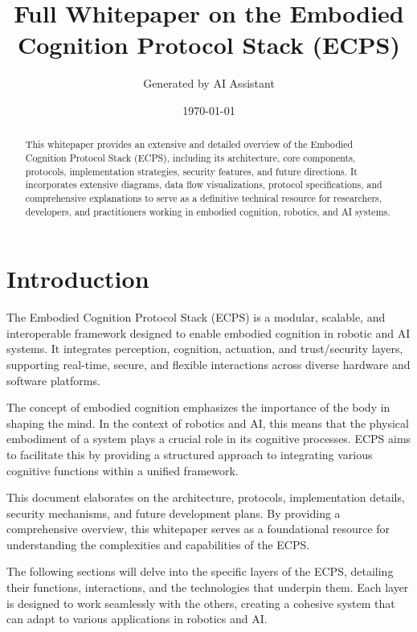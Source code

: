 \documentclass[12pt]{article}
\begin{document}
\title{Full Whitepaper on the Embodied Cognition Protocol Stack (ECPS)}
\author{Generated by AI Assistant}
\date{\today}
\maketitle

\begin{abstract}
This whitepaper provides an extensive and detailed overview of the Embodied Cognition Protocol Stack (ECPS), including its architecture, core components, protocols, implementation strategies, security features, and future directions. It incorporates extensive diagrams, data flow visualizations, protocol specifications, and comprehensive explanations to serve as a definitive technical resource for researchers, developers, and practitioners working in embodied cognition, robotics, and AI systems.
\end{abstract}

\tableofcontents

\section{Introduction}
The Embodied Cognition Protocol Stack (ECPS) is a modular, scalable, and interoperable framework designed to enable embodied cognition in robotic and AI systems. It integrates perception, cognition, actuation, and trust/security layers, supporting real-time, secure, and flexible interactions across diverse hardware and software platforms. 

The concept of embodied cognition emphasizes the importance of the body in shaping the mind. In the context of robotics and AI, this means that the physical embodiment of a system plays a crucial role in its cognitive processes. ECPS aims to facilitate this by providing a structured approach to integrating various cognitive functions within a unified framework.

This document elaborates on the architecture, protocols, implementation details, security mechanisms, and future development plans. By providing a comprehensive overview, this whitepaper serves as a foundational resource for understanding the complexities and capabilities of the ECPS.

The following sections will delve into the specific layers of the ECPS, detailing their functions, interactions, and the technologies that underpin them. Each layer is designed to work seamlessly with the others, creating a cohesive system that can adapt to various applications in robotics and AI.
\end{document}
